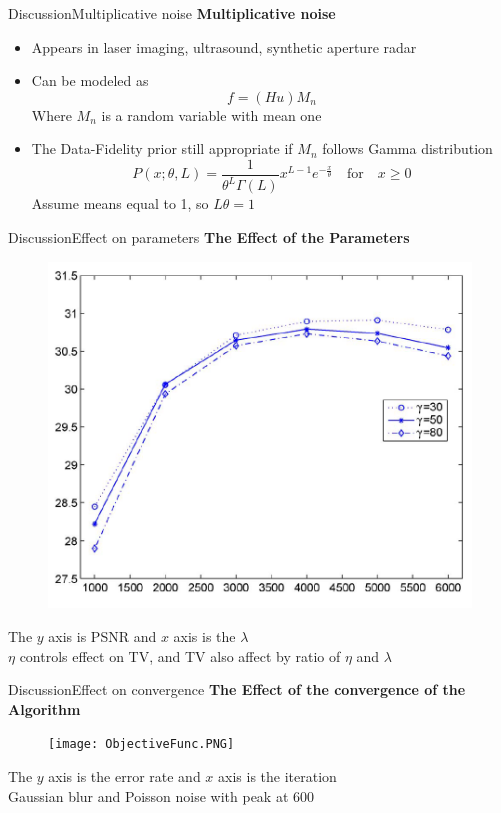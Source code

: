 \documentclass{beamer}
\begin{document}
\begin{frame}[t]{Discussion}{Multiplicative noise}
\textbf{Multiplicative noise}
\begin{itemize}
    \item Appears in laser imaging, ultrasound, synthetic aperture radar
    \item Can be modeled as 
    \[
        f = (Hu)M_n
    \]
    Where $M_n$ is a random variable with mean one
    \item The Data-Fidelity prior still appropriate if $M_n$ follows Gamma distribution
    \[
        P(x;\theta, L) = \frac{1}{\theta^L\Gamma(L)}x^{L-1}e^{-\frac{x}{\theta}} \quad \textrm{for} \quad x \geq 0
    \]
    Assume means equal to 1, so $L\theta=1$
\end{itemize}
\end{frame}

\begin{frame}[t]{Discussion}{Effect on parameters}
    \textbf{The Effect of the Parameters}
    \begin{figure}
        \centering
        \includegraphics[scale=0.33]{PSNR_VS_LAMBDA.PNG}
    \end{figure}
    \footnotesize{
        The $y$ axis is PSNR and $x$ axis is the $\lambda$ \\
        $\eta$ controls effect on TV, and TV also affect by ratio of $\eta$ and $\lambda$
    }
\end{frame}

\begin{frame}[t]{Discussion}{Effect on convergence}
    \textbf{The Effect of the convergence of the Algorithm}
    \begin{figure}
        \centering
        \texttt{[image: ObjectiveFunc.PNG]}
    \end{figure}
    \footnotesize{
        The $y$ axis is the error rate and $x$ axis is the iteration \\
        Gaussian blur and Poisson noise with peak at 600
    }
\end{frame}
\end{document}
